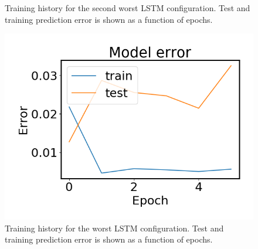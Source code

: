 \begin{figure}
\begin{minipage}[b]{0.49\linewidth}
            \caption{Training history for the second worst LSTM configuration. Test and training prediction error is shown as a function of epochs.}
        \end{minipage}
    \end{figure}
    
    \begin{figure}
        \begin{minipage}[b]{0.45\linewidth}
            \centering
            \includegraphics[width = \textwidth]{report/figures/analysis/lstm_gridsearch/worst_lstm_error_-1.png}
            \caption{Training history for the worst LSTM configuration. Test and training prediction error is shown as a function of epochs.}
        \end{minipage}
    \end{figure}

